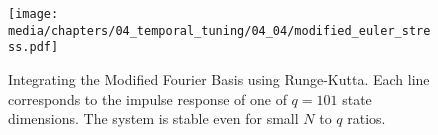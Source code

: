 \begin{figure}
	\texttt{[image: media/chapters/04\_temporal\_tuning/04\_04/modified\_euler\_stress.pdf]}%
	\caption[Integrating the Modified Fourier Basis using Runge-Kutta]{Integrating the Modified Fourier Basis using Runge-Kutta.
	Each line corresponds to the impulse response of one of $q = 101$ state dimensions. The system is stable even for small $N$ to $q$ ratios.
	}
	\label{fig:modified_euler_stress}
\end{figure}


%
%
%
